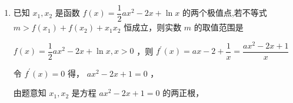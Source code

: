 \begin{enumerate}
\begin{enumerate}
\begin{jieda}
\begin{enumerate}
\begin{dingautolist}{172}
                    所以 $- \dfrac{{a}^{2}}{2} - a + a\ln a > \left( {1 - \dfrac{1}{2}{{e}}^{2}}\right) a$ ,即 $\ln a - \dfrac{a}{2} - 2 + \dfrac{1}{2}{{e}}^{2} > 0$ ,
                    
                    令 $h\left( a\right)  = \ln a - \dfrac{1}{2}a - 2 + \dfrac{1}{2}{{e}}^{2}\left( {a > 1}\right)$ ,则 ${h}^{\prime }\left( a\right)  = \dfrac{2 - a}{2a},h\left( a\right)  > 0$ ,
                    
                    令 ${h}^{\prime }\left( a\right)  > 0$ ,得 $1 < a < 2$ ; 令 ${h}^{\prime }\left( a\right)  < 0$ ,得 $a > 2$ ,
                    
                    所以函数 $h\left( a\right)$ 在 $\left( {1,2}\right)$ 上单调递增, $\left( {2, + \infty }\right)$ 上单调递减,
                    
                    且 $h\left( 1\right)  = \ln 1 - \dfrac{1}{2} \times  1 - 2 + \dfrac{1}{2}{{e}}^{2} = \dfrac{{{e}}^{2} - 5}{2} > 0,h\left( {{e}}^{2}\right)  = {\operatorname{lne}}^{2} - \dfrac{1}{2} \times  {{e}}^{2} - 2 + \dfrac{1}{2}{{e}}^{2} = 0$ ,
                    
                    所以由 $h\left( a\right)  > 0$ ,可得 $1 < a < {{e}}^{2}$ 
                \end{dingautolist}
                
                综上， $\dfrac{1}{{{e}}^{2} - 4} < a < 1$ 或 $1 < a < {{e}}^{2}$ ，即 $a$ 的取值范围是 $\left( {\dfrac{1}{{{e}}^{2} - 4},1}\right)  \cup  \left( {1,{{e}}^{2}}\right)$ .
            \end{enumerate}
        \end{jieda}
        
        \item 已知 $x_1,{x}_{2}$ 是函数 $f\left( x\right)  = \dfrac{1}{2}a{x}^{2} - {2x} + \ln x$ 的两个极值点,若不等式 $m > f\left( {x}_{1}\right)  + f\left( {x}_{2}\right)  + {x}_{1}{x}_{2}$ 恒成立，则实数 $m$ 的取值范围是
        \begin{jieda}
            $f\left( x\right)  = \dfrac{1}{2}a{x}^{2} - {2x} + \ln x,x > 0$ ，则 ${f}^{\prime }\left( x\right)  = {ax} - 2 + \dfrac{1}{x} = \dfrac{a{x}^{2} - {2x} + 1}{x}$
            
            令 ${f}^{\prime }\left( x\right)  = 0$ 得， $a{x}^{2} - {2x} + 1 = 0$ ，
            
            由题意知 ${x}_{1},{x}_{2}$ 是方程 $a{x}^{2} - {2x} + 1 = 0$ 的两正根，
            

\end{jieda}
\end{enumerate}
\end{enumerate}
